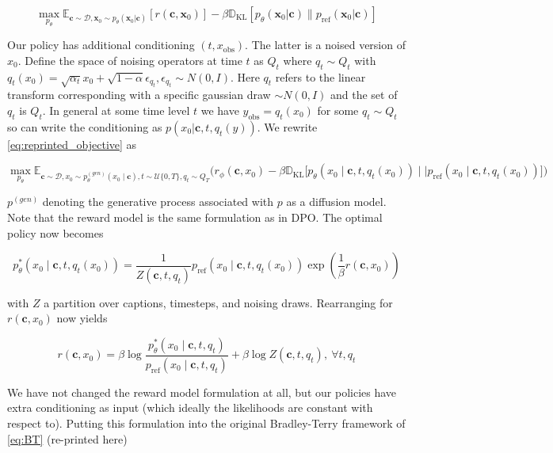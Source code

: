 \documentclass[10pt,twocolumn,letterpaper]{article}
\newcommand{\yobs}{y_{\text{obs}}}
\newcommand{\xobs}{x_{\text{obs}}}
\newcommand{\x}{\ensuremath{\boldsymbol{x}}}
\newcommand{\vc}{\ensuremath{\boldsymbol{c}}}
\newcommand{\bbE}{\ensuremath{\mathbb{E}}}
\newcommand{\bbD}{\ensuremath{\mathbb{D}}}
\newcommand{\kl}{\ensuremath{\bbD_{\text{KL}}}}
\newcommand{\calvar}[1]{\ensuremath{\mathcal{#1}}}
\newcommand{\calD}{\calvar{D}}
\newcommand{\pref}{p_{\text{ref}}}
\begin{document}
\begin{equation}
    \max_{p_\theta} \bbE_{\vc\sim \calD,\x_0\sim p_\theta(\x_0|\vc)} \left[r(\vc,\x_0)\right] - \beta \kl\left[p_\theta(\x_0|\vc)\|p_{\text{ref}}(\x_0|\vc)\right]
    \label{eq:reprinted_objective}
\end{equation}

Our policy has additional conditioning $(t,\xobs)$. The latter is a noised version of $x_0$. Define the space of noising operators at time $t$ as $Q_t$ where $q_t \sim Q_t$ with $q_t(x_0) = \sqrt{\alpha_t} x_0 + \sqrt{1-\alpha} \epsilon_{q_t}, \epsilon_{q_t} \sim N(0, I)$. Here $q_t$ refers to the linear transform corresponding with a specific gaussian draw $\sim N(0, I)$ and the set of $q_t$ is $Q_t$. In general at some time level $t$ we have $\yobs = q_t(x_0)$ for some $q_t \sim Q_t$ so can write the conditioning as $p(x_0 | \vc, t, q_t(y))$. We rewrite \cref{eq:reprinted_objective} as

\begin{equation} \max_{p_{\theta}}  \mathbb{E}_{\vc \sim \mathcal{D}, x_0 \sim p^{(gen)}_{\theta}(x_0 \mid \vc),t \sim \mathcal{U}\{0,T\},q_t \sim Q_T } 
\bigl(r_{\phi}(\vc, x_0) - \beta\mathbb{D}_{\textrm{KL}}\bigl[p_{\theta}(x_0 \mid \vc, t, q_t(x_0))\mid \mid \pref(x_0\mid \vc, t, q_t(x_0))\bigr]\bigr)
\end{equation}

$p^{(gen)}$ denoting the generative process associated with $p$ as a diffusion model.
Note that the reward model is the same formulation as in DPO. The optimal policy now becomes

\begin{equation}p^*_\theta(x_0\mid \vc, t, q_t(x_0)) = \frac{1}{Z(\vc, t, q_t)}\pref(x_0\mid \vc, t, q_t(x_0))\exp\left(\frac{1}{\beta}r(\vc, x_0)\right) \end{equation}

with $Z$ a partition over captions, timesteps, and noising draws. Rearranging for $r(\vc, x_0)$ now yields

\begin{equation}\label{eq:noise_aware_reward_statement}
    r(\vc, x_0) =\beta \log \frac{p^*_\theta(x_0\mid \vc, t, q_t)}{\pref(x_0\mid \vc, t, q_t)} + \beta \log Z(\vc, t, q_t),\ \forall t, q_t
\end{equation}

We have not changed the reward model formulation at all, but our policies have extra conditioning as input (which ideally the likelihoods are constant with respect to). Putting this formulation into the original Bradley-Terry framework of \cref{eq:BT} (re-printed here)
\end{document}
